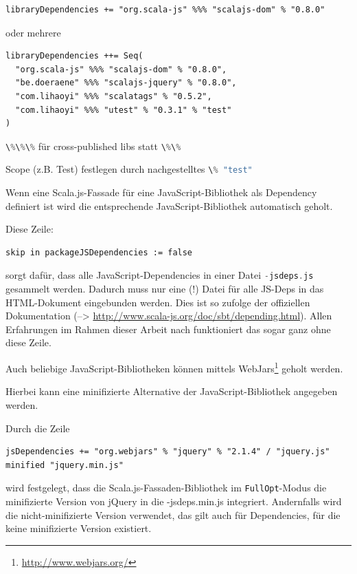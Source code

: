 \documentclass[a4paper, 12pt, hidelinks, listof=totoc, listoftables=totoc, bibliography=totoc]{scrreprt}
\newcommand{\code}[1]{\lstinline[language=Scala, style=inline]|#1|}
\begin{document}
\begin{lstlisting}[style=snippet]
libraryDependencies += "org.scala-js" %%% "scalajs-dom" % "0.8.0"
\end{lstlisting}

oder mehrere

\begin{lstlisting}[style=snippet]
libraryDependencies ++= Seq(
  "org.scala-js" %%% "scalajs-dom" % "0.8.0",
  "be.doeraene" %%% "scalajs-jquery" % "0.8.0",
  "com.lihaoyi" %%% "scalatags" % "0.5.2",
  "com.lihaoyi" %%% "utest" % "0.3.1" % "test"
)
\end{lstlisting}

\code{\%\%\%} für cross-published libs statt \code{\%\%}

Scope (z.B. Test) festlegen durch nachgestelltes \code{\% "test"}

Wenn eine Scala.js-Fassade für eine JavaScript-Bibliothek als Dependency definiert ist wird die entsprechende JavaScript-Bibliothek automatisch geholt.


Diese Zeile:

\begin{lstlisting}[style=snippet]
skip in packageJSDependencies := false
\end{lstlisting}

sorgt dafür, dass alle JavaScript-Dependencies in einer Datei \code{-jsdeps.js} gesammelt werden. Dadurch muss nur eine (!) Datei für alle JS-Deps in das HTML-Dokument eingebunden werden. Dies ist so zufolge der offiziellen Dokumentation (-->  \url{http://www.scala-js.org/doc/sbt/depending.html}). Allen Erfahrungen im Rahmen dieser Arbeit nach funktioniert das sogar ganz ohne diese Zeile.

Auch beliebige JavaScript-Bibliotheken können mittels WebJars\footnote{\url{http://www.webjars.org/}} geholt werden.

Hierbei kann eine minifizierte Alternative der JavaScript-Bibliothek angegeben werden. 

Durch die Zeile

\begin{lstlisting}[style=snippet]
jsDependencies += "org.webjars" % "jquery" % "2.1.4" / "jquery.js" minified "jquery.min.js"
\end{lstlisting}

wird festgelegt, dass die Scala.js-Fassaden-Bibliothek im \code{FullOpt}-Modus die minifizierte Version von jQuery in die 
-jsdeps.min.js integriert. Andernfalls
wird die nicht-minifizierte Version verwendet, das gilt auch für Dependencies, für die keine minifizierte Version existiert.
\end{document}
